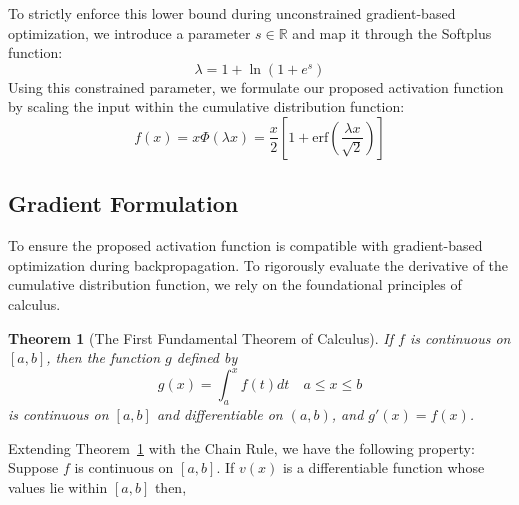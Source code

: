 \documentclass[11pt]{article}
\newtheorem{theorem}{Theorem}[section]
\begin{document}
\noindent To strictly enforce this lower bound during unconstrained gradient-based optimization, we introduce a parameter $s \in \mathbb{R}$ and map it through the Softplus function:
\begin{equation*}
\lambda = 1 + \ln(1 + e^s)
\end{equation*}
Using this constrained parameter, we formulate our proposed activation function by scaling the input within the cumulative distribution function:
\begin{equation*}
f(x) = x \Phi(\lambda x) = \dfrac{x}{2}\left[ 1 + \text{erf}\left(\dfrac{\lambda x}{\sqrt{2}}\right) \right]
\end{equation*}
\subsection{Gradient Formulation}
\noindent To ensure the proposed activation function is compatible with gradient-based optimization during backpropagation. To rigorously evaluate the derivative of the cumulative distribution function, we rely on the foundational principles of calculus.
\begin{theorem}[The First Fundamental Theorem of Calculus] 
If $f$ is continuous on $[a,b]$, then the function $g$ defined by
\begin{equation*}
g(x) = \int_{a}^{x}f(t)dt \quad a \leq x \leq b
\end{equation*}
is continuous on $[a,b]$ and differentiable on $(a,b)$, and $g'(x) = f(x)$.
\label{FFTC}
\end{theorem}
\noindent Extending Theorem~\ref{FFTC} with the Chain Rule, we have the following property: Suppose $f$ is continuous on $[a,b]$. If $v(x)$ is a differentiable function whose values lie within $[a,b]$ then,\\
\end{document}
